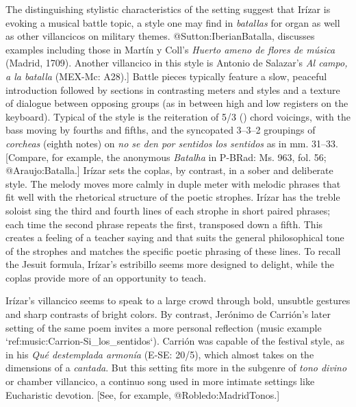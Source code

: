 The distinguishing stylistic characteristics of the setting suggest that Irízar is evoking a musical battle topic, a style one may find in \emph{batallas} for organ as well as other villancicos on military themes.
\Autocite[s. v. \emph{battle music}]{Grove} @Sutton:IberianBatalla, discusses examples including those in Martín y Coll's \emph{Huerto ameno de flores de música} (Madrid, 1709).
Another villancico in this style is Antonio de Salazar's \emph{Al campo, a la batalla} (MEX-Mc: A28).]
Battle pieces typically feature a slow, peaceful introduction followed by sections in contrasting meters and styles and a texture of dialogue between opposing groups (as in between high and low registers on the keyboard).
Typical of the style is the reiteration of 5/3 () chord voicings, with the bass moving by fourths and fifths, and the syncopated 3--3--2 groupings of \emph{corcheas} (eighth notes) on \emph{no se den por sentidos los sentidos} as in mm.
31--33.
[Compare, for example, the anonymous \emph{Batalha} in P-BRad: Ms. 963, fol. 56; @Araujo:Batalla.]  %
Irízar sets the coplas, by contrast, in a sober and deliberate style.
The melody moves more calmly in duple meter with melodic phrases that fit well with the rhetorical structure of the poetic strophes.
Irízar has the treble soloist sing the third and fourth lines of each strophe in short paired phrases; each time the second phrase repeats the first, transposed down a fifth.
This creates a feeling of a teacher saying  and  that suits the general philosophical tone of the strophes and matches the specific poetic phrasing of these lines.
To recall the Jesuit formula, Irízar's estribillo seems more designed to delight, while the coplas provide more of an opportunity to teach.

Irízar's villancico seems to speak to a large crowd through bold, unsubtle gestures and sharp contrasts of bright colors.
By contrast, Jerónimo de Carrión's later setting of the same poem invites a more personal reflection (music example `ref:music:Carrion-Si_los_sentidos`).
\Autocite[149--152]{Cashner:WLSCM32}
Carrión was capable of the festival style, as in his \emph{Qué destemplada armonía} (E-SE: 20/5), which almost takes on the dimensions of a \emph{cantada}.
But this setting fits more in the subgenre of \emph{tono divino} or chamber villancico, a continuo song used in more intimate settings like Eucharistic devotion.
[See, for example, @Robledo:MadridTonos.]

